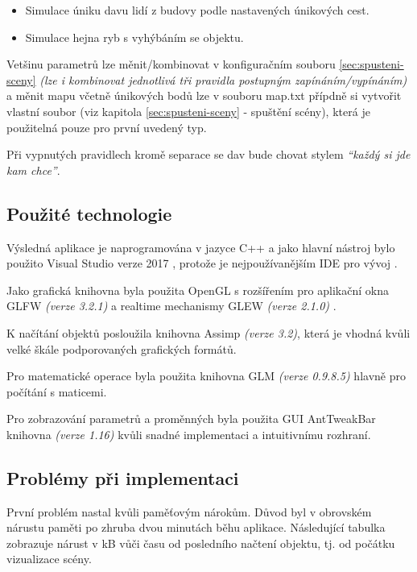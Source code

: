 \documentclass[czech,public,dept460,male,cpdeclaration]{diploma}
\begin{document}
\begin{itemize}
	\item Simulace úniku davu lidí z budovy podle nastavených únikových cest.
	\item Simulace hejna ryb s vyhýbáním se objektu.
\end{itemize}

Vetšinu parametrů lze měnit/kombinovat v konfiguračním souboru \ref{sec:spusteni-sceny} \textit{(lze i kombinovat jednotlivá tři pravidla postupným zapínáním/vypínáním)} a měnit mapu včetně únikových bodů lze v souboru map.txt přípdně si vytvořit vlastní soubor (viz kapitola \ref{sec:spusteni-sceny} - spuštění scény), která je použitelná pouze pro první uvedený typ.

Při vypnutých pravidlech kromě separace se dav bude chovat stylem \textit{``každý si jde kam chce''}.

\subsection{Použité technologie}
Výsledná aplikace je naprogramována v jazyce C++ a jako hlavní nástroj bylo použito Visual Studio verze 2017 \cite{linkToVisualStudio}, protože je nejpoužívanějším IDE pro vývoj \cite{linkToTopIDE}. 

Jako grafická knihovna byla použita OpenGL \cite{linkToOpenGL} s rozšířením pro aplikační okna GLFW \textit{(verze 3.2.1)} \cite{linkToGLFW} a realtime mechanismy GLEW \textit{(verze 2.1.0)} \cite{linkToGLew}.

K načítání objektů posloužila knihovna Assimp \cite{linkToAssimp} \textit{(verze 3.2)}, která je vhodná kvůli velké škále podporovaných grafických formátů.

Pro matematické operace byla použita knihovna GLM \cite{linkToGLM} \textit{(verze 0.9.8.5)} hlavně pro počítání s maticemi.

Pro zobrazování parametrů a proměnných byla použita GUI AntTweakBar knihovna \textit{(verze 1.16)} \cite{linkToAntTweakBar} kvůli snadné implementaci a intuitivnímu rozhraní.

\subsection{Problémy při implementaci}\label{sec:problemy-pri-implementaci}

První problém nastal kvůli paměťovým nárokům. Důvod byl v obrovském nárustu paměti po zhruba dvou minutách běhu aplikace. Následující tabulka zobrazuje nárust v kB vůči času od posledního načtení objektu, tj. od počátku vizualizace scény.
\end{document}
